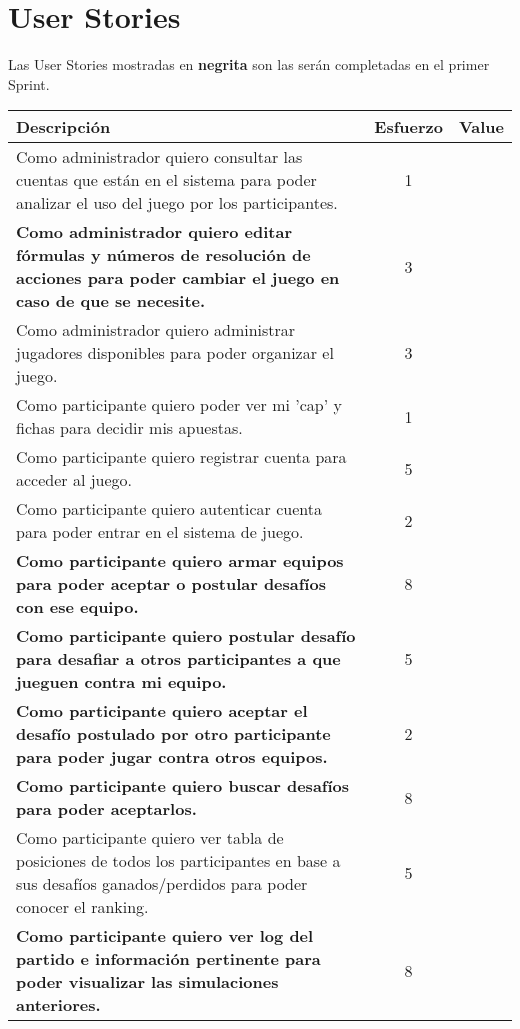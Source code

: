 \documentclass[11pt,a4paper]{article}
\begin{document}
\maketitle

\section*{User Stories}

Las User Stories mostradas en \textbf{negrita} son las ser\'an completadas en el primer Sprint.

\begin{table}[h]
\begin{tabularx}{\textwidth}{|X|c|c|}
\hline
\textbf{Descripci\'on} & \textbf{Esfuerzo} & \textbf{  Value  } \\ \hline
Como administrador quiero consultar las cuentas que están en el sistema para poder analizar el uso del juego por los participantes. & \Large1 & \\ \hline
\textbf{Como administrador quiero editar fórmulas y números  de resolución de acciones para poder cambiar el juego en caso de que se necesite.} & \Large3 & \\ \hline
Como administrador quiero administrar jugadores disponibles para poder organizar el juego. & \Large3 & \\ \hline
Como participante quiero poder ver mi 'cap' y fichas para decidir mis apuestas. & \Large1 & \\ \hline
\vspace{1ex} Como participante quiero registrar cuenta para acceder al juego. \vspace{1ex} & \Large5 & \\ \hline
Como participante quiero autenticar cuenta para poder entrar en el sistema de juego. & \Large2 & \\ \hline
\textbf{Como participante quiero armar equipos para poder aceptar o postular desafíos con ese equipo.} & \Large8 & \\ \hline
\textbf{Como participante quiero postular desafío para desafiar a otros participantes a que jueguen contra mi equipo.} & \Large5 & \\ \hline
\textbf{Como participante quiero aceptar el desafío postulado por otro participante para poder jugar contra otros equipos.} & \Large2 & \\ \hline
\vspace{1ex} \textbf{Como participante quiero buscar desafíos para poder aceptarlos.} \vspace{1ex} & \Large8 & \\ \hline
Como participante quiero ver tabla de posiciones de todos los participantes en base a sus desafíos ganados/perdidos para poder conocer el ranking. & \Large5 & \\ \hline
\textbf{Como participante quiero ver log del partido e información pertinente para poder visualizar las simulaciones anteriores.} & \Large8 & \\ \hline
\end{tabularx}
\end{table}
\end{document}
